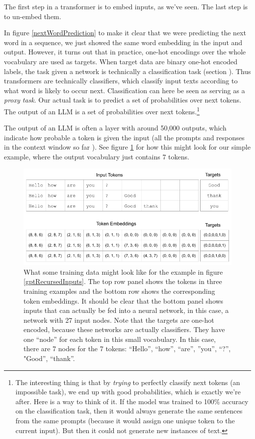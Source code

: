 The first step in a transformer is to embed inputs, as we've seen. The last step is to un-embed them. 

In figure \ref{nextWordPrediction} to make it clear that we were predicting the next word in a sequence, we just showed the same word embedding in the input and output.  However, it turns out that in practice, one-hot encodings over the whole vocabulary are used as targets. When target data are binary one-hot encoded labels, the task given a network is technically a classification task (section ). Thus transformers are technically classifiers, which classify input texts according to what word is likely to occur next. Classification can here be seen as serving as a \emph{proxy task}. Our actual task is to predict a set of probabilities over next tokens. The output of an LLM is a set of probabilities over next tokens.\footnote{The interesting thing is that by \emph{trying} to perfectly classify next tokens (an impossible task), we end up with good probabilities, which is exactly we're after. Here is a way to think of it. If the model was trained to 100\% accuracy on the classification task, then it would always generate the same sentences from the same prompts (because it would assign one unique token to the current input). But then it could not generate new instances of text.}

The output of an LLM is often a  layer with around 50,000 outputs,  which  indicate how probable a token is given the input (all the prompts and responses in the context window so far ). See figure \ref{contextWindow} for how this might look for our simple example, where the output vocabulary just contains 7 tokens.

\begin{figure}[h]
\centering
\includegraphics[scale=.45]{./images/contextWindow.png}
\caption[Jeff Yoshimi]{What some training data might look like for the example in figure \ref{gptRecursedInputs}. The top row panel shows the tokens in three training examples and the bottom row shows the corresponding token embeddings.  It should be clear that the bottom panel shows inputs that can actually be fed into a neural network, in this case, a network with 27 input nodes. Note that the targets are one-hot encoded, because these networks are actually classifiers. They have one ``node'' for each token in this small vocabulary. In this case, there are 7 nodes for the 7 tokens: ``Hello'', ``how'', ``are'', ''you'', ``?'', "Good'', ``thank''.  }
\label{contextWindow}
\end{figure}

